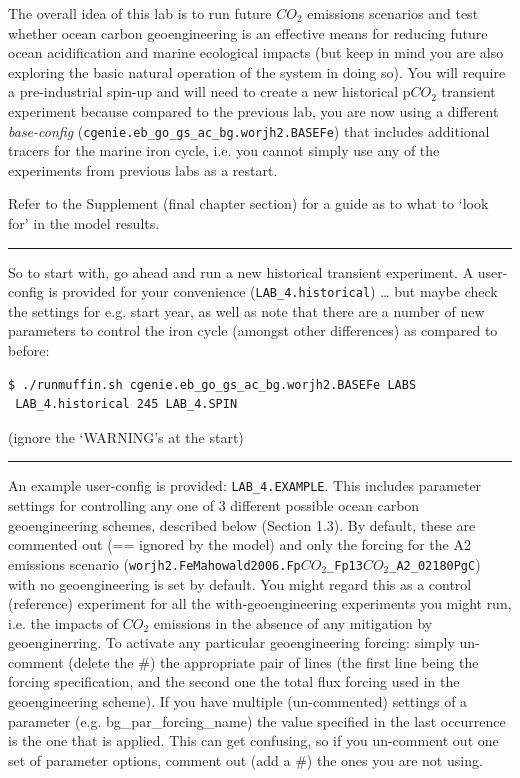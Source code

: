 \documentclass[11pt,fleqn]{book} %
\begin{document}
The overall idea of this lab is to run future \(CO_{2}\) emissions scenarios and test whether ocean carbon geoengineering is an effective means for reducing future ocean acidification and marine ecological impacts (but keep in mind you are also exploring the basic natural operation of the system in doing so). You will require a pre-industrial spin-up and will need to create a new historical p\(CO_{2}\) transient experiment because compared to the previous lab, you are now using a different \textit{base-config} (\texttt{cgenie.eb\_go\_gs\_ac\_bg.worjh2.BASEFe}) that includes additional tracers for the marine iron cycle, i.e. you cannot simply use any of the experiments from previous labs as a restart.

Refer to the Supplement (final chapter section) for a guide as to what to ‘look for’ in the model results.

\vspace{1mm}
\noindent\rule{4cm}{0.1mm}
\vspace{2mm}

\noindent So to start with, go ahead and run a new historical transient experiment. A user-config is provided for your convenience (\texttt{LAB\_4.historical}) … but maybe check the settings for e.g. start year, as well as note that there are a number of new parameters to control the iron cycle (amongst other differences) as compared to before: 
\vspace{-2pt}\begin{verbatim}
$ ./runmuffin.sh cgenie.eb_go_gs_ac_bg.worjh2.BASEFe LABS
 LAB_4.historical 245 LAB_4.SPIN
\end{verbatim}\vspace{-2pt}
(ignore the ‘WARNING’s at the start)

\vspace{1mm}
\noindent\rule{4cm}{0.1mm}
\vspace{2mm}

\noindent An example user-config is provided: \texttt{LAB\_4.EXAMPLE}. This includes parameter settings for controlling any one of 3 different possible ocean carbon geoengineering schemes, described below (Section 1.3). By default, these are commented out (== ignored by the model) and only the forcing for the A2 emissions scenario (\texttt{worjh2.FeMahowald2006.Fp\(CO_{2}\)\_Fp13\(CO_{2}\)\_A2\_02180PgC}) with no geoengineering is set by default. You might regard this as a control (reference) experiment for all the with-geoengineering experiments you might run, i.e. the impacts of \(CO_{2}\) emissions in the absence of any mitigation by geoenginerring. To activate any particular geoengineering forcing: simply un-comment (delete the \#) the appropriate pair of lines (the first line being the forcing specification, and the second one the total flux forcing used in the geoengineering scheme). If you have multiple (un-commented) settings of a parameter (e.g. bg\_par\_forcing\_name) the value specified in the last occurrence is the one that is applied. This can get confusing, so if you un-comment out one set of parameter options, comment out (add a \#) the ones you are not using.
\end{document}
